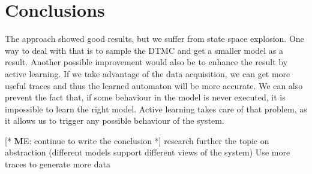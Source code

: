 \documentclass[
a4paper,
12pt
]{scrartcl}
\newcommand\me[1]{ [* {\textbf ME:} #1 *]}
\begin{document}
\section{Conclusions}
The approach showed good results, but we suffer from state space explosion. One way to deal with that is to sample the DTMC and get a smaller model as a result. Another possible improvement would also be to enhance the result by active learning. If we take advantage of the data acquisition, we can get more useful traces and thus the learned automaton will be more accurate. We can also prevent the fact that, if some behaviour in the model is never executed, it is impossible to learn the right model. Active learning takes care of that problem, as it allows us to trigger any possible behaviour of the system.

\me{continue to write the conclusion}
research further the topic on abstraction (different models support different views of the system)
Use more traces to generate more data
\appendix
 
 
\end{document}
